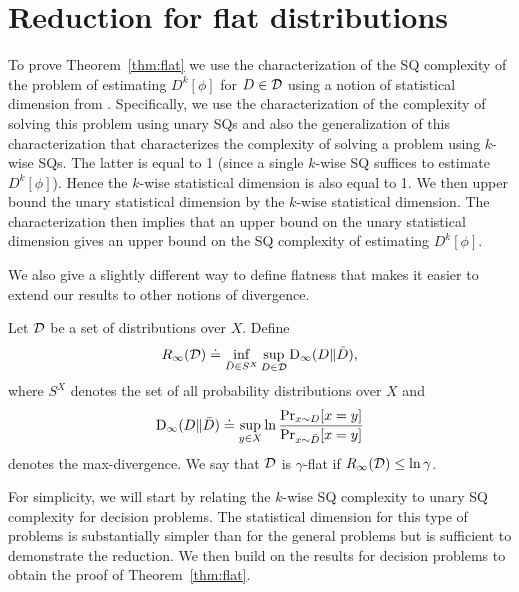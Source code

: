 \section{Reduction for flat distributions}\label{sec:pf_flat}
\newcommand{\dci}{{\kappa_1}}
To prove Theorem~\ref{thm:flat} we use the characterization of the SQ complexity of the problem of estimating $D^k[\phi]$ for $D\in \mathcal{D}$ using a notion of statistical dimension from \cite{Feldman:16sqd}. Specifically, we use the characterization of the complexity of solving this problem using unary SQs and also the generalization of this characterization that characterizes the complexity of solving a problem using $k$-wise SQs. The latter is equal to 1 (since a single $k$-wise SQ suffices to estimate $D^k[\phi]$). Hence the $k$-wise statistical dimension is also equal to 1. We then upper bound the unary statistical dimension by the $k$-wise statistical dimension. The characterization then implies that an upper bound on the unary statistical dimension gives an upper bound on the SQ complexity of estimating $D^k[\phi]$.

We also give a slightly different way to define flatness that makes it easier to extend our results to other notions of divergence.
\begin{defn}
Let $\mathcal{D}$ be a set of distributions over $X$. Define
$$R_\infty(\mathcal{D}) \doteq \inf_{\bar D \in S^X} \sup_{D\in \mathcal{D}} {\mathrm{D}}_\infty(D\|\bar D), $$
where $S^X$ denotes the set of all probability distributions over $X$ and $${\mathrm{D}}_\infty(D\|\bar D) \doteq \sup_{y\in X} \ln \frac{\Pr_{x\sim D}[x=y]}{\Pr_{x\sim \bar D}[x=y]}$$ denotes the max-divergence. We say that $\mathcal{D}$ is $\gamma$-flat if $R_\infty(\mathcal{D}) \leq \ln \gamma$.
\end{defn}

For simplicity, we will start by relating the $k$-wise SQ complexity to unary SQ complexity for decision problems. The statistical dimension for this type of problems is substantially simpler than for the general problems but is sufficient to demonstrate the reduction. We then build on the results for decision problems to obtain the proof of Theorem~\ref{thm:flat}.

